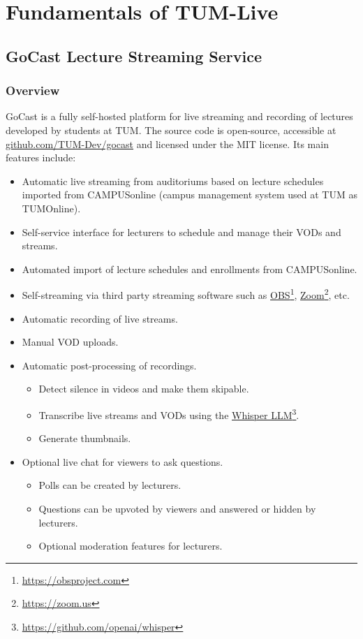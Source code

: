 
\chapter{Fundamentals of TUM-Live}\label{chapter:fundamentals}

\section{GoCast Lecture Streaming Service}

\subsection{Overview}
GoCast is a fully self-hosted platform for live streaming and recording of lectures developed by students at \ac{TUM}. The source code is open-source, accessible at \href{https://github.com/TUM-Dev/gocast}{github.com/TUM-Dev/gocast} and licensed under the MIT license. Its main features include:

\begin{itemize}
    \item Automatic live streaming from auditoriums based on lecture schedules imported from CAMPUSonline (campus management system used at \ac{TUM} as TUMOnline).
    \item Self-service interface for lecturers to schedule and manage their \ac{VOD}s and streams.
    \item Automated import of lecture schedules and enrollments from CAMPUSonline.
    \item Self-streaming via third party streaming software such as \href{https://obsproject.com}{OBS}\footnote{\url{https://obsproject.com}}, \href{https://zoom.us}{Zoom}\footnote{\url{https://zoom.us}}, etc.
    \item Automatic recording of live streams.
    \item Manual \ac{VOD} uploads.
    \item Automatic post-processing of recordings.
    \begin{itemize}
        \item Detect silence in videos and make them skipable.
        \item Transcribe live streams and \ac{VOD}s using the \href{https://github.com/openai/whisper}{Whisper LLM}\footnote{\url{https://github.com/openai/whisper}}.
        \item Generate thumbnails.
    \end{itemize}
    \item Optional live chat for viewers to ask questions.
    \begin{itemize}
        \item Polls can be created by lecturers.
        \item Questions can be upvoted by viewers and answered or hidden by lecturers.
        \item Optional moderation features for lecturers.
    \end{itemize}
\end{itemize}

